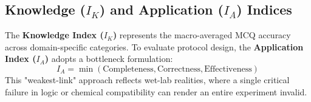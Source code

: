 \documentclass[runningheads]{llncs}
\begin{document}
\begin{table}[htbp]
    \centering
    \caption{The Hierarchical Metric System of ClearEval. Evaluation scales from static knowledge retrieval to empirically-grounded protocol execution.}
    \label{tab:metrics}
\end{table}

\subsection{Knowledge ($I_K$) and Application ($I_A$) Indices}The \textbf{Knowledge Index ($I_K$)} represents the macro-averaged MCQ accuracy across domain-specific categories. To evaluate protocol design, the \textbf{Application Index ($I_A$)} adopts a bottleneck formulation:
\begin{equation}
I_A = \min(\text{Completeness}, \text{Correctness}, 
\text{Effectiveness})
\end{equation}
This "weakest-link" approach reflects wet-lab realities, where a single critical failure in logic or chemical compatibility can render an entire experiment invalid.
\end{document}
